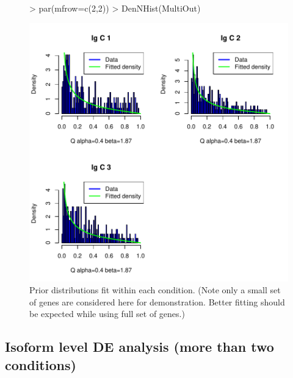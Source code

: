 \documentclass{article}
\begin{document}
\begin{figure}[h]
\centering
\begin{Schunk}
\begin{Sinput}
> par(mfrow=c(2,2))
> DenNHist(MultiOut)
\end{Sinput}
\end{Schunk}
\includegraphics{EBSeq_Vignette-041}
\caption{ Prior distributions fit within each condition. 
(Note only a small set of genes are considered here for demonstration.
Better fitting should be expected while using full set of genes.)}
\label{fig:GeneMultiDenNHist}
\end{figure}
\newpage
\clearpage
\newpage
\subsection{Isoform level DE analysis (more than two conditions)}
\label{sec:detailedisomulticond}
\end{document}
